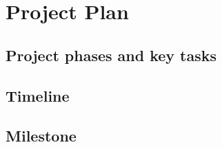 \chapter{Project Plan}

\section{Project phases and key tasks}

\section{Timeline}

\section{Milestone}


